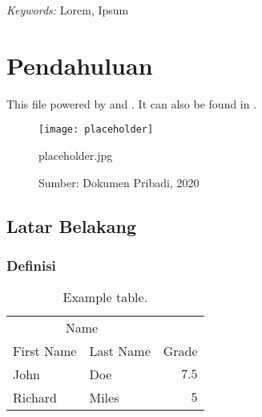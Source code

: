 \documentclass[11pt]{simart} %
\begin{document}
\hspace*{3.6mm}\textit{Keywords:} Lorem, Ipsum %

\vspace{30pt} %

% 

\section{Pendahuluan}

This file powered by \citep{einstein} and \citep{latexcompanion}. It can also be found in \cite{knuthwebsite}.

\begin{figure}[htpb]
	\centering
	\texttt{[image: placeholder]}
	\caption{placeholder.jpg}
	\caption*{Sumber: Dokumen Pribadi, 2020}
	\label{fig:placeholder-jpg}
\end{figure}
\lipsum[1-3]

\subsection{Latar Belakang}

\lipsum[4-5]


\subsubsection{Definisi}

\lipsum[6-7]
\begin{table}[h] %
	\caption{Example table.}
	\centering
	\begin{tabular}{l l r}
		\toprule
		\multicolumn{2}{c}{Name}  \\
		\cmidrule(r){1-2}
		First Name  &  Last Name  &  Grade  \\
		\midrule
		John        &  Doe        &  $7.5$  \\
		Richard     &  Miles      &  $5$  \\
		\bottomrule
	\end{tabular}
\end{table}
\end{document}
